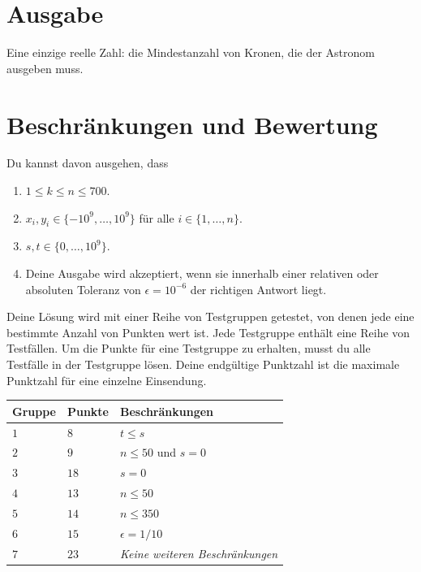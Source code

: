 \section*{Ausgabe}

Eine einzige reelle Zahl: die Mindestanzahl von Kronen, die der Astronom ausgeben muss.

\section*{Beschränkungen und Bewertung}

Du kannst davon ausgehen, dass 
\begin{enumerate}
\item $1\leq k\leq n\leq 700$. %
\item $x_i, y_i\in \{-10^9,\ldots, 10^9\}$ für alle $i\in\{1,\ldots,n\}$. %
\item $s,t\in \{0,\ldots, 10^9\}$. %
\item Deine Ausgabe wird akzeptiert, wenn sie innerhalb einer relativen oder absoluten Toleranz von $\epsilon = 10^{-6}$ der richtigen Antwort liegt.
\end{enumerate}


Deine Lösung wird mit einer Reihe von Testgruppen getestet, von denen jede eine bestimmte Anzahl von Punkten wert ist.
Jede Testgruppe enthält eine Reihe von Testfällen.
Um die Punkte für eine Testgruppe zu erhalten, musst du alle Testfälle in der Testgruppe lösen.
Deine endgültige Punktzahl ist die maximale Punktzahl für eine einzelne Einsendung.

\medskip
\noindent
\begin{tabular}{lll}
  Gruppe & Punkte & Beschränkungen\\\hline
  $1$ & $8$ &  $t\leq s$\\
  $2$ & $9$ & $n\le 50$ und $s=0$\\
  $3$ & $18$ & $s=0$\\
  $4$ & $13$ & $n\leq 50$\\
  $5$ & $14$ & $n\leq 350$\\
  $6$ & $15$ & $\epsilon = 1/10$\\
  $7$ & $23$ & \emph{Keine weiteren Beschränkungen}\\
\end{tabular}
